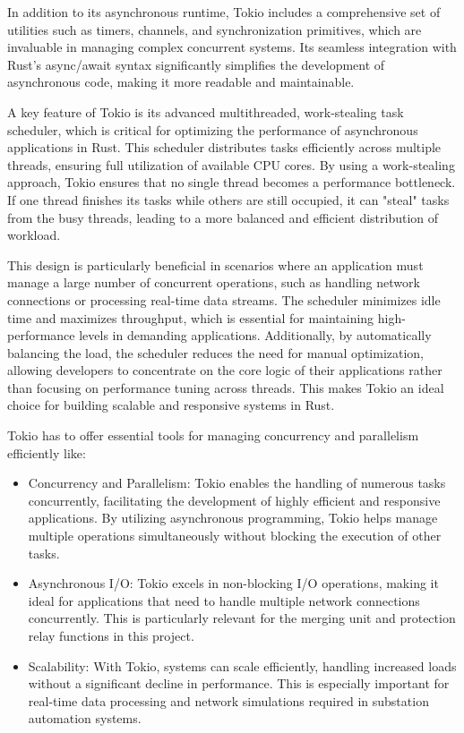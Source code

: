In addition to its asynchronous runtime, Tokio includes a comprehensive set of utilities such as timers, channels, and synchronization primitives, which are invaluable in managing complex concurrent systems. Its seamless integration with Rust's async/await syntax significantly simplifies the development of asynchronous code, making it more readable and maintainable.

A key feature of Tokio is its advanced multithreaded, work-stealing task scheduler, which is critical for optimizing the performance of asynchronous applications in Rust. This scheduler distributes tasks efficiently across multiple threads, ensuring full utilization of available CPU cores. By using a work-stealing approach, Tokio ensures that no single thread becomes a performance bottleneck. If one thread finishes its tasks while others are still occupied, it can "steal" tasks from the busy threads, leading to a more balanced and efficient distribution of workload.

This design is particularly beneficial in scenarios where an application must manage a large number of concurrent operations, such as handling network connections or processing real-time data streams. The scheduler minimizes idle time and maximizes throughput, which is essential for maintaining high-performance levels in demanding applications. Additionally, by automatically balancing the load, the scheduler reduces the need for manual optimization, allowing developers to concentrate on the core logic of their applications rather than focusing on performance tuning across threads. This makes Tokio an ideal choice for building scalable and responsive systems in Rust.

Tokio has to offer essential tools for managing concurrency and parallelism efficiently like:

\begin{itemize} 
	\item Concurrency and Parallelism: Tokio enables the handling of numerous tasks concurrently, facilitating the development of highly efficient and responsive applications. By utilizing asynchronous programming, Tokio helps manage multiple operations simultaneously without blocking the execution of other tasks. 
	\item Asynchronous I/O: Tokio excels in non-blocking I/O operations, making it ideal for applications that need to handle multiple network connections concurrently. This is particularly relevant for the merging unit and protection relay functions in this project. 
	\item Scalability: With Tokio, systems can scale efficiently, handling increased loads without a significant decline in performance. This is especially important for real-time data processing and network simulations required in substation automation systems.
\end{itemize}

